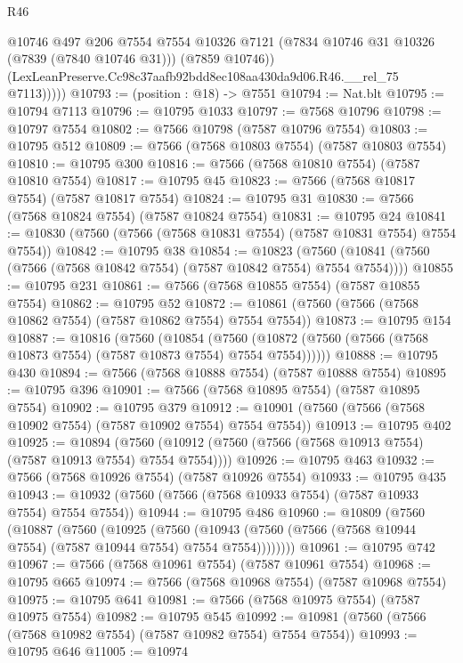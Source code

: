 \begin{lexlean}{R46}
\begin{coremodule}
              @10746
              @497
              @206
              @7554
              @7554
              @10326
              @7121
              (@7834 @10746 @31 @10326 (@7839 (@7840 @10746 @31)))
              (@7859 @10746))
            (LexLeanPreserve.Cc98c37aafb92bdd8ec108aa430da9d06.R46.__rel_75 @7113)))))
@10793 := (position : @18) -> @7551
@10794 := Nat.blt
@10795 := @10794 @7113
@10796 := @10795 @1033
@10797 := @7568 @10796
@10798 := @10797 @7554
@10802 := @7566 @10798 (@7587 @10796 @7554)
@10803 := @10795 @512
@10809 := @7566 (@7568 @10803 @7554) (@7587 @10803 @7554)
@10810 := @10795 @300
@10816 := @7566 (@7568 @10810 @7554) (@7587 @10810 @7554)
@10817 := @10795 @45
@10823 := @7566 (@7568 @10817 @7554) (@7587 @10817 @7554)
@10824 := @10795 @31
@10830 := @7566 (@7568 @10824 @7554) (@7587 @10824 @7554)
@10831 := @10795 @24
@10841 := @10830 (@7560 (@7566 (@7568 @10831 @7554) (@7587 @10831 @7554) @7554 @7554))
@10842 := @10795 @38
@10854 := @10823
    (@7560 (@10841 (@7560 (@7566 (@7568 @10842 @7554) (@7587 @10842 @7554) @7554 @7554))))
@10855 := @10795 @231
@10861 := @7566 (@7568 @10855 @7554) (@7587 @10855 @7554)
@10862 := @10795 @52
@10872 := @10861 (@7560 (@7566 (@7568 @10862 @7554) (@7587 @10862 @7554) @7554 @7554))
@10873 := @10795 @154
@10887 := @10816
    (@7560
      (@10854
        (@7560 (@10872 (@7560 (@7566 (@7568 @10873 @7554) (@7587 @10873 @7554) @7554 @7554))))))
@10888 := @10795 @430
@10894 := @7566 (@7568 @10888 @7554) (@7587 @10888 @7554)
@10895 := @10795 @396
@10901 := @7566 (@7568 @10895 @7554) (@7587 @10895 @7554)
@10902 := @10795 @379
@10912 := @10901 (@7560 (@7566 (@7568 @10902 @7554) (@7587 @10902 @7554) @7554 @7554))
@10913 := @10795 @402
@10925 := @10894
    (@7560 (@10912 (@7560 (@7566 (@7568 @10913 @7554) (@7587 @10913 @7554) @7554 @7554))))
@10926 := @10795 @463
@10932 := @7566 (@7568 @10926 @7554) (@7587 @10926 @7554)
@10933 := @10795 @435
@10943 := @10932 (@7560 (@7566 (@7568 @10933 @7554) (@7587 @10933 @7554) @7554 @7554))
@10944 := @10795 @486
@10960 := @10809
    (@7560
      (@10887
        (@7560
          (@10925
            (@7560
              (@10943 (@7560 (@7566 (@7568 @10944 @7554) (@7587 @10944 @7554) @7554 @7554))))))))
@10961 := @10795 @742
@10967 := @7566 (@7568 @10961 @7554) (@7587 @10961 @7554)
@10968 := @10795 @665
@10974 := @7566 (@7568 @10968 @7554) (@7587 @10968 @7554)
@10975 := @10795 @641
@10981 := @7566 (@7568 @10975 @7554) (@7587 @10975 @7554)
@10982 := @10795 @545
@10992 := @10981 (@7560 (@7566 (@7568 @10982 @7554) (@7587 @10982 @7554) @7554 @7554))
@10993 := @10795 @646
@11005 := @10974

\end{coremodule}
\end{lexlean}
